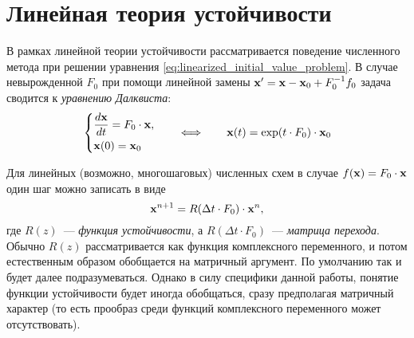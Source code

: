\section{Линейная теория устойчивости}
\label{sec:linear_stability}

В рамках линейной теории устойчивости рассматривается поведение численного метода при решении уравнения \eqref{eq:linearized_initial_value_problem}.
В случае невырожденной $ F_0 $ при помощи линейной замены $ \mathbf{x}' = \mathbf{x} - \mathbf{x}_0 + F_0^{-1} f_0 $ задача сводится к \emph{уравнению Далквиста}:
%
\begin{equation}
    \label{eq:Dahlquist_equation}
    \begin{dcases}
        \dfrac{d \mathbf{x}}{d t} = F_0 \cdot \mathbf{x}, \\
        \mathbf{x}(0) = \mathbf{x}_0
    \end{dcases}
    \qquad
    \Longleftrightarrow
    \qquad
    \mathbf{x}(t) = \exp(t \cdot F_0) \cdot \mathbf{x}_0
\end{equation}

Для линейных (возможно, многошаговых) численных схем в случае $ f(\mathbf{x}) = F_0 \cdot \mathbf{x} $ один шаг можно \cite{lambert1991methods} записать в виде
%
\begin{equation}
    \label{eq:stability_function}
    \mathbf{x}^{n+1} = R(\Delta t \cdot F_0) \cdot \mathbf{x}^n,
\end{equation}
%
где $ R(z) $~--- \emph{функция устойчивости}, а $ R(\Delta t \cdot F_0) $~--- \emph{матрица перехода}.
Обычно $ R(z) $ рассматривается как функция комплексного переменного, и потом естественным образом обобщается на матричный аргумент.
По умолчанию так и будет далее подразумеваться.
Однако в силу специфики данной работы, понятие функции устойчивости будет иногда обобщаться, сразу предполагая матричный характер
(то есть прообраз среди функций комплексного переменного может отсутствовать).

